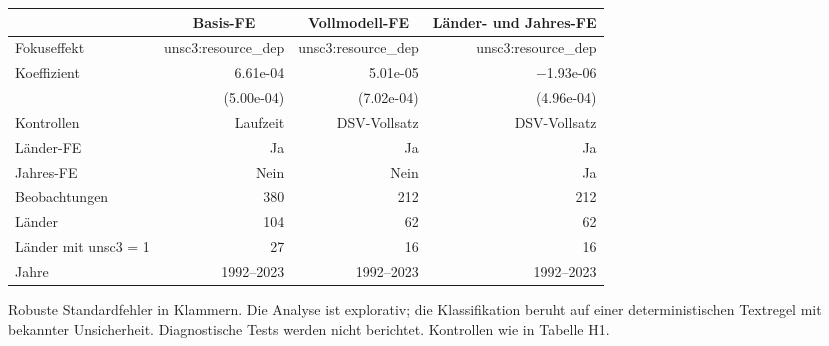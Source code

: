 \begingroup
\scriptsize
\setlength{\tabcolsep}{4pt}
\begin{center}
\begin{tabular}{l r r r}
\toprule
& \multicolumn{1}{c}{Basis-FE} & \multicolumn{1}{c}{Vollmodell-FE} & \multicolumn{1}{c}{L\"ander- und Jahres-FE} \\
\midrule
Fokuseffekt & unsc3:resource\_dep & unsc3:resource\_dep & unsc3:resource\_dep \\
Koeffizient & 6.61e-04 & 5.01e-05 & $-$1.93e-06 \\
& (5.00e-04) & (7.02e-04) & (4.96e-04) \\
\midrule
Kontrollen & Laufzeit & DSV-Vollsatz & DSV-Vollsatz \\
L\"ander-FE & Ja & Ja & Ja \\
Jahres-FE & Nein & Nein & Ja \\
\midrule
Beobachtungen & 380 & 212 & 212 \\
L\"ander & 104 & 62 & 62 \\
L\"ander mit unsc3 = 1 & 27 & 16 & 16 \\
Jahre & 1992--2023 & 1992--2023 & 1992--2023 \\
\bottomrule
\end{tabular}
\label{tab:h4_modellvergleich}
\end{center}
\noindent\footnotesize Robuste Standardfehler in Klammern. Die Analyse ist explorativ; die Klassifikation beruht auf einer deterministischen Textregel mit bekannter Unsicherheit. Diagnostische Tests werden nicht berichtet. Kontrollen wie in Tabelle H1.\par
\endgroup
